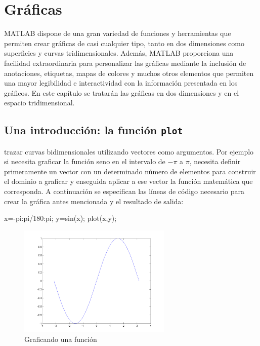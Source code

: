 \chapter{Gráficas}

MATLAB dispone de una gran variedad de funciones y herramientas que
permiten crear gráficas de casi cualquier tipo, tanto en dos dimensiones
como superficies y curvas tridimensionales. Además, MATLAB proporciona
una facilidad extraordinaria para personalizar las gráficas mediante la
inclusión de anotaciones, etiquetas, mapas de colores y muchos otros
elementos que permiten una mayor legibilidad e interactividad con la
información presentada en los gráficos. En este capítulo se tratarán las
gráficas en dos dimensiones y en el espacio tridimensional.

\section{Una introducción: la función \texttt{plot}}

trazar curvas bidimensionales utilizando vectores como argumentos. Por
ejemplo si necesita graficar la función seno en el intervalo de
$-\pi$ a $\pi$, necesita definir primeramente un
vector con un determinado número de elementos para construir el dominio
a graficar y enseguida aplicar a ese vector la función matemática que
corresponda. A continuación se especifican las líneas de código
necesario para crear la gráfica antes mencionada y el resultado de
salida:

\begin{matlab}
x=-pi:pi/180:pi;
y=sin(x);
plot(x,y);
\end{matlab}


\begin{figure}[htbp]
    \centering
    \includegraphics[width=0.65\textwidth]{images/ch4/img_4_1.png}
    \caption{Graficando una función}
    \label{fig:img_4_1}
\end{figure}


